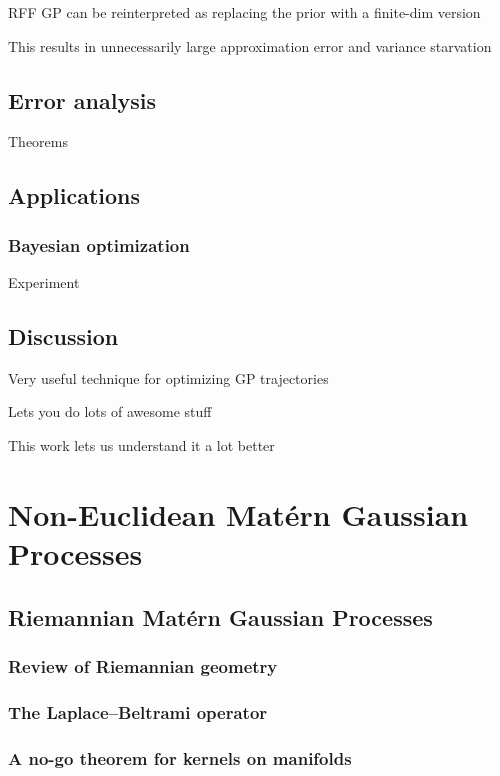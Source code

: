 \documentclass[11pt]{book}
\begin{document}
RFF GP can be reinterpreted as replacing the prior with a finite-dim version

This results in unnecessarily large approximation error and variance starvation

\section{Error analysis}

Theorems

\section{Applications}

\subsection{Bayesian optimization}

Experiment

\section{Discussion}

Very useful technique for optimizing GP trajectories

Lets you do lots of awesome stuff

This work lets us understand it a lot better





\chapter{Non-Euclidean Matérn Gaussian Processes}
\label{ch:noneuclidean}

\section{Riemannian Matérn Gaussian Processes}

\subsection{Review of Riemannian geometry}
\subsection{The Laplace--Beltrami operator}
\subsection{A no-go theorem for kernels on manifolds}
\end{document}
